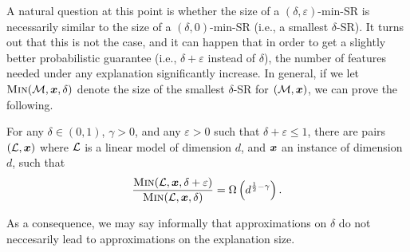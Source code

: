 
A natural question at this point is whether the size of a $(\delta, \varepsilon)$-min-SR is necessarily similar to the size of a $(\delta, 0)$-min-SR (i.e., a smallest $\delta$-SR). It turns out that this is not the case, and it can happen that in order to get a slightly better probabilistic guarantee (i.e., $\delta + \varepsilon$ instead of $\delta$), the number of features needed under any explanation significantly increase.
In general, if we let $\operatorname{\textnormal{\textsc{Min}}}(\mathcal{M}, {\bm{x}}, \delta)$ denote the size of the smallest $\delta$-SR for $(\mathcal{M}, {\bm{x}})$, we can prove the following.

\begin{proposition}\label{prop:delta-sr-size}
For any $\delta \in (0, 1)$, $\gamma > 0$, and any $\varepsilon > 0$ such that $\delta + \varepsilon \leq 1$, there are pairs $(\mathcal{L}, {\bm{x}})$ where $\mathcal{L}$ is a linear model of dimension $d$, and ${\bm{x}}$ an instance of dimension $d$, such that
	\[ 
		\frac{\operatorname{\textnormal{\textsc{Min}}}(\mathcal{L}, {\bm{x}}, \delta+\varepsilon)}{\operatorname{\textnormal{\textsc{Min}}}(\mathcal{L}, {\bm{x}}, \delta)} = \Omega\left(d^{\frac{1}{2} - \gamma}\right).
	\]
\end{proposition}

As a consequence, we may say informally that approximations on $\delta$ do not neccesarily lead to approximations on the explanation size.

